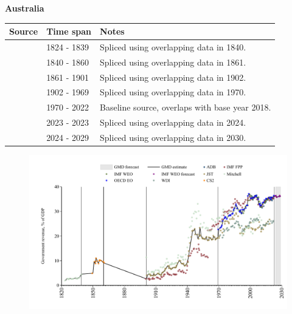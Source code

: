 \documentclass[12pt,a4paper,landscape]{article}
\begin{document}
\begin{adjustbox}{max totalsize={\paperwidth}{\paperheight},center}
\begin{minipage}[t][\textheight][t]{\textwidth}
\vspace*{0.5cm}
{}
\begin{center}
{\Large\bfseries Australia}
\end{center}
\vspace{0.5cm}
\begin{table}[H]
\centering
\small
\begin{tabular}{|l|l|l|}
\hline
\textbf{Source} & \textbf{Time span} & \textbf{Notes} \\
\hline
\rowcolor{white}\cite{Mitchell}& 1824 - 1839 &Spliced using overlapping data in 1840.\\
\rowcolor{lightgray}\cite{CS2_AUS}& 1840 - 1860 &Spliced using overlapping data in 1861.\\
\rowcolor{white}\cite{IMF_FPP}& 1861 - 1901 &Spliced using overlapping data in 1902.\\
\rowcolor{lightgray}\cite{JST}& 1902 - 1969 &Spliced using overlapping data in 1970.\\
\rowcolor{white}\cite{OECD_EO}& 1970 - 2022 &Baseline source, overlaps with base year 2018.\\
\rowcolor{lightgray}\cite{ADB}& 2023 - 2023 &Spliced using overlapping data in 2024.\\
\rowcolor{white}\cite{IMF_WEO_forecast}& 2024 - 2029 &Spliced using overlapping data in 2030.\\
\hline
\end{tabular}
\end{table}
\begin{figure}[H]
\centering
\includegraphics[width=\textwidth,height=0.6\textheight,keepaspectratio]{graphs/AUS_govrev_GDP.pdf}
\end{figure}
\end{minipage}
\end{adjustbox}
\end{document}

